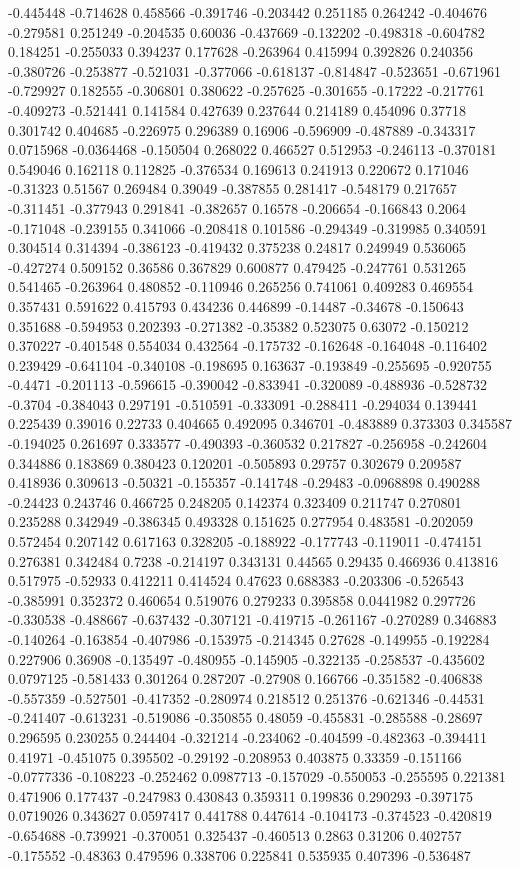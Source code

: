 -0.445448 -0.714628 0.458566 -0.391746 -0.203442 0.251185 0.264242 -0.404676 -0.279581 0.251249 -0.204535 0.60036 -0.437669 -0.132202 -0.498318 -0.604782 0.184251 -0.255033 0.394237 0.177628 -0.263964 0.415994 0.392826 0.240356 -0.380726 -0.253877 -0.521031 -0.377066 -0.618137 -0.814847 -0.523651 -0.671961 -0.729927 0.182555 -0.306801 0.380622 -0.257625 -0.301655 -0.17222 -0.217761 -0.409273 -0.521441 0.141584 0.427639 0.237644 0.214189 0.454096 0.37718 0.301742 0.404685 -0.226975 0.296389 0.16906 -0.596909 -0.487889 -0.343317 0.0715968 -0.0364468 -0.150504 0.268022 0.466527 0.512953 -0.246113 -0.370181 0.549046 0.162118 0.112825 -0.376534 0.169613 0.241913 0.220672 0.171046 -0.31323 0.51567 0.269484 0.39049 -0.387855 0.281417 -0.548179 0.217657 -0.311451 -0.377943 0.291841 -0.382657 0.16578 -0.206654 -0.166843 0.2064 -0.171048 -0.239155 0.341066 -0.208418 0.101586 -0.294349 -0.319985 0.340591 0.304514 0.314394 -0.386123 -0.419432 0.375238 0.24817 0.249949 0.536065 -0.427274 0.509152 0.36586 0.367829 0.600877 0.479425 -0.247761 0.531265 0.541465 -0.263964 0.480852 -0.110946 0.265256 0.741061 0.409283 0.469554 0.357431 0.591622 0.415793 0.434236 0.446899 -0.14487 -0.34678 -0.150643 0.351688 -0.594953 0.202393 -0.271382 -0.35382 0.523075 0.63072 -0.150212 0.370227 -0.401548 0.554034 0.432564 -0.175732 -0.162648 -0.164048 -0.116402 0.239429 -0.641104 -0.340108 -0.198695 0.163637 -0.193849 -0.255695 -0.920755 -0.4471 -0.201113 -0.596615 -0.390042 -0.833941 -0.320089 -0.488936 -0.528732 -0.3704 -0.384043 0.297191 -0.510591 -0.333091 -0.288411 -0.294034 0.139441 0.225439 0.39016 0.22733 0.404665 0.492095 0.346701 -0.483889 0.373303 0.345587 -0.194025 0.261697 0.333577 -0.490393 -0.360532 0.217827 -0.256958 -0.242604 0.344886 0.183869 0.380423 0.120201 -0.505893 0.29757 0.302679 0.209587 0.418936 0.309613 -0.50321 -0.155357 -0.141748 -0.29483 -0.0968898 0.490288 -0.24423 0.243746 0.466725 0.248205 0.142374 0.323409 0.211747 0.270801 0.235288 0.342949 -0.386345 0.493328 0.151625 0.277954 0.483581 -0.202059 0.572454 0.207142 0.617163 0.328205 -0.188922 -0.177743 -0.119011 -0.474151 0.276381 0.342484 0.7238 -0.214197 0.343131 0.44565 0.29435 0.466936 0.413816 0.517975 -0.52933 0.412211 0.414524 0.47623 0.688383 -0.203306 -0.526543 -0.385991 0.352372 0.460654 0.519076 0.279233 0.395858 0.0441982 0.297726 -0.330538 -0.488667 -0.637432 -0.307121 -0.419715 -0.261167 -0.270289 0.346883 -0.140264 -0.163854 -0.407986 -0.153975 -0.214345 0.27628 -0.149955 -0.192284 0.227906 0.36908 -0.135497 -0.480955 -0.145905 -0.322135 -0.258537 -0.435602 0.0797125 -0.581433 0.301264 0.287207 -0.27908 0.166766 -0.351582 -0.406838 -0.557359 -0.527501 -0.417352 -0.280974 0.218512 0.251376 -0.621346 -0.44531 -0.241407 -0.613231 -0.519086 -0.350855 0.48059 -0.455831 -0.285588 -0.28697 0.296595 0.230255 0.244404 -0.321214 -0.234062 -0.404599 -0.482363 -0.394411 0.41971 -0.451075 0.395502 -0.29192 -0.208953 0.403875 0.33359 -0.151166 -0.0777336 -0.108223 -0.252462 0.0987713 -0.157029 -0.550053 -0.255595 0.221381 0.471906 0.177437 -0.247983 0.430843 0.359311 0.199836 0.290293 -0.397175 0.0719026 0.343627 0.0597417 0.441788 0.447614 -0.104173 -0.374523 -0.420819 -0.654688 -0.739921 -0.370051 0.325437 -0.460513 0.2863 0.31206 0.402757 -0.175552 -0.48363 0.479596 0.338706 0.225841 0.535935 0.407396 -0.536487 